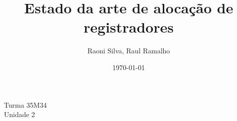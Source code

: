 \documentclass[a4paper,12pt]{article}
\title{Estado da arte de alocação de registradores}
\author{Raoni Silva, Raul Ramalho}
\date{\today}
\begin{document}
\maketitle

\noindent Turma 35M34 \\ Unidade 2

\newpage

\tableofcontents










\end{document}
